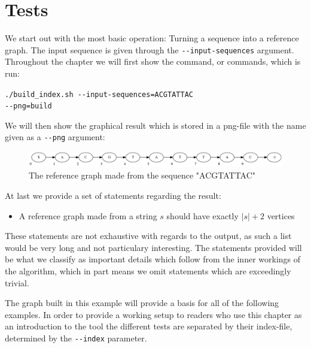 \documentclass[thesis.tex]{subfiles}
\begin{document}
\section{Tests}
We start out with the most basic operation: Turning a sequence into a reference graph. The input sequence is given through the \texttt{-{}-input-sequences} argument. Throughout the chapter we will first show the command, or commands, which is run:\\
\par\noindent
\texttt{./build\_index.sh -{}-input-sequences=ACGTATTAC\\
-{}-png=build}\\
\par\noindent
We will then show the graphical result which is stored in a png-file with the name given as a \texttt{-{}-png} argument:\\
\begin{figure}[!h]
  \begin{mdframed}
    \includegraphics[width=\textwidth]{output/build.png} 
  \end{mdframed}
  \caption{The reference graph made from the sequence "ACGTATTAC"}
  \label{fig:validation_ref}
\end{figure}
\par\noindent
At last we provide a set of statements regarding the result:
\begin{itemize}
\item A reference graph made from a string $s$ should have exactly $|s|+2$ vertices
\end{itemize}
These statements are not exhaustive with regards to the output, as such a list would be very long and not particulary interesting. The statements provided will be what we classify as important details which follow from the inner workings of the algorithm, which in part means we omit statements which are exceedingly trivial.\\
\par\noindent
The graph built in this example will provide a basis for all of the following examples. In order to provide a working setup to readers who use this chapter as an introduction to the tool the different tests are separated by their index-file, determined by the \texttt{-{}-index} parameter.
\end{document}

